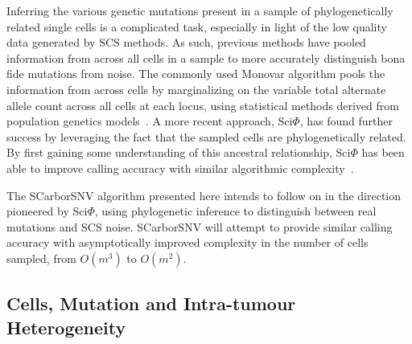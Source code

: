 \documentclass[../main.tex]{subfiles}
\begin{document}
Inferring the various genetic mutations present in a sample of phylogenetically related single cells is a complicated task, especially in light of the low quality data generated by SCS methods.
As such, previous methods have pooled information from across all cells in a sample to more accurately distinguish bona fide mutations from noise.
The commonly used Monovar algorithm pools the information from across cells by marginalizing on the variable total alternate allele count across all cells at each locus, using statistical methods derived from population genetics models~\cite{monovar}.
A more recent approach, Sci$\Phi$, has found further success by leveraging the fact that the sampled cells are phylogenetically related.
By first gaining some understanding of this ancestral relationship, Sci$\Phi$ has been able to improve calling accuracy with similar algorithmic complexity~\cite{sciphi}.

The SCarborSNV algorithm presented here intends to follow on in the direction pioneered by Sci$\Phi$, using phylogenetic inference to distinguish between real mutations and SCS noise.
SCarborSNV will attempt to provide similar calling accuracy with asymptotically improved complexity in the number of cells sampled, from $O(m^3)$ to $O(m^2)$.

\subsection{Cells, Mutation and Intra-tumour Heterogeneity}


 
\end{document}
